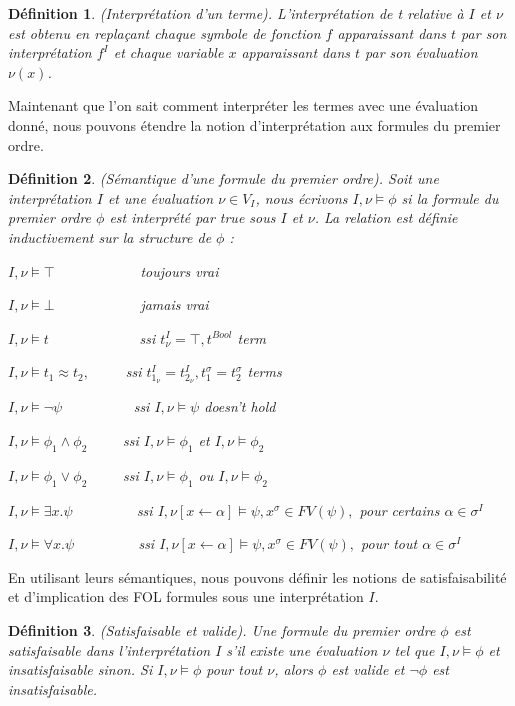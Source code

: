\documentclass[9pt]{book}
\newtheorem{definition}{D\'efinition}[section]
\begin{document}
\begin{definition}
(Interpr\'etation d'un terme). L'interpr\'etation de t relative \`a $I$ et $\nu$ est obtenu en repla\c{c}ant chaque symbole de fonction $f$ apparaissant dans $t$ par son interpr\'etation $f^{I}$ et chaque variable $x$ apparaissant dans $t$ par son \'evaluation $\nu(x)$.
\end{definition}
Maintenant que l'on sait comment interpr\'eter les termes avec une \'evaluation donn\'e, nous pouvons \'etendre la notion d'interpr\'etation aux formules du premier ordre.
\begin{definition}
(S\'emantique d'une formule du premier ordre). Soit une interpr\'etation $I$ et une \'evaluation $\nu \in V_{I}$, nous \'ecrivons $I,\nu\models\phi$ si la formule du premier ordre $\phi$ est interpr\'et\'e par true sous $I$ et $\nu$. La relation est d\'efinie inductivement sur la structure de $\phi$ :\par
$I,\nu\models\top$~~~~~~~~~~~~toujours vrai\par
$I,\nu\models\bot$~~~~~~~~~~~~jamais vrai\par
$I,\nu\models t$~~~~~~~~~~~~ ssi $t^{I}_{\nu}=\top,t^{Bool}$ term\par
$I,\nu\models t_{1}\approx t_{2},$~~~~~ssi $t^{I}_{1_{\nu}}=t^{I}_{2_{\nu}},t^{\sigma}_{1}=t^{\sigma}_{2}$ terms\par
$I,\nu\models\neg\psi$~~~~~~~~~~ssi $I,\nu\models\psi$ doesn't hold\par
$I,\nu\models\phi_{1}\land\phi_{2}$~~~~~ssi $I,\nu\models\phi_{1}$ et $I,\nu\models\phi_{2}$\par
$I,\nu\models\phi_{1}\lor\phi_{2}$~~~~~ssi $I,\nu\models\phi_{1}$ ou $I,\nu\models\phi_{2}$\par
$I,\nu\models\exists x.\psi$~~~~~~~~~ssi $I,\nu[x\leftarrow\alpha]\models\psi, x^{\sigma}\in FV(\psi),$ pour certains $\alpha\in\sigma^{I}$\par
$I,\nu\models\forall x.\psi$~~~~~~~~~ssi $I,\nu[x\leftarrow\alpha]\models\psi, x^{\sigma}\in FV(\psi),$ pour tout $\alpha\in\sigma^{I}$
\end{definition}

En utilisant leurs s\'emantiques, nous pouvons d\'efinir les notions de satisfaisabilit\'e  et d'implication des FOL formules sous une interpr\'etation $I$.

\begin{definition}
(Satisfaisable et valide). Une formule du premier ordre $\phi$ est satisfaisable dans l'interpr\'etation $I$ s'il existe une \'evaluation $\nu$ tel que $I,\nu\models\phi$ et insatisfaisable sinon. Si $I,\nu\models\phi$ pour tout $\nu$, alors $\phi$ est valide et $\neg\phi$ est insatisfaisable.
\end{definition}
\end{document}
